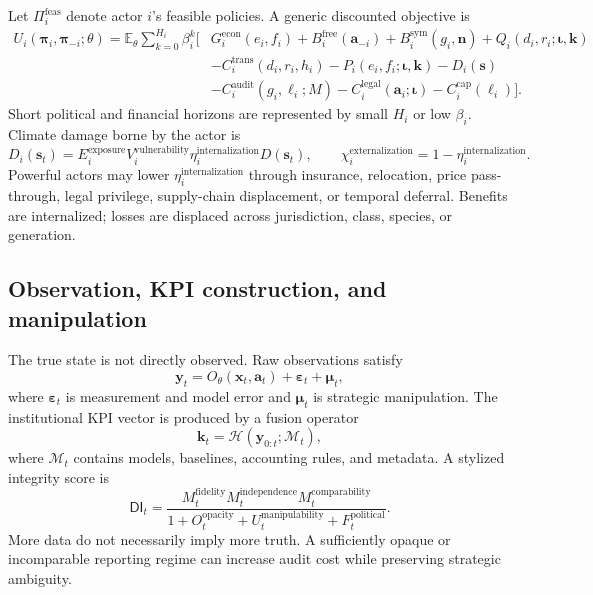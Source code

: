 \documentclass[11pt,a4paper]{article}
\numberwithin{equation}{section}
\theoremstyle{definition}
\theoremstyle{plain}
\theoremstyle{remark}
\newcommand{\E}{\mathbb{E}}
\newcommand{\policy}{\boldsymbol{\pi}}
\newcommand{\state}{\bm{x}}
\newcommand{\kpi}{\bm{k}}
\newcommand{\action}{\bm{a}}
\newcommand{\inst}{\bm{\iota}}
\newcommand{\narr}{\bm{n}}
\begin{document}
Let $\Pi_i^{\mathrm{feas}}$ denote actor $i$'s feasible policies. A generic discounted objective is
\begin{align}
U_i(\policy_i,\policy_{-i};\theta)
=\E_{\theta}\sum_{k=0}^{H_i}\beta_i^k\Big[&
G_i^{\mathrm{econ}}(e_i,f_i)
+B_i^{\mathrm{free}}(\action_{-i})
+B_i^{\mathrm{sym}}(g_i,\narr)
+Q_i(d_i,r_i;\inst,\kpi) \nonumber\\
&-C_i^{\mathrm{trans}}(d_i,r_i,h_i)
-P_i(e_i,f_i;\inst,\kpi)
-D_i(\bm{s}) \nonumber\\
&-C_i^{\mathrm{audit}}(g_i,\ell_i;M)
-C_i^{\mathrm{legal}}(\action_i;\inst)
-C_i^{\mathrm{cap}}(\ell_i)
\Big].
\label{eq:utility}
\end{align}
Short political and financial horizons are represented by small $H_i$ or low $\beta_i$. Climate damage borne by the actor is
\begin{equation}
D_i(\bm{s}_t)=E_i^{\mathrm{exposure}}V_i^{\mathrm{vulnerability}}
\eta_i^{\mathrm{internalization}}D(\bm{s}_t),
\qquad
\chi_i^{\mathrm{externalization}}=1-\eta_i^{\mathrm{internalization}}.
\label{eq:externalization}
\end{equation}
Powerful actors may lower $\eta_i^{\mathrm{internalization}}$ through insurance, relocation, price pass-through, legal privilege, supply-chain displacement, or temporal deferral. Benefits are internalized; losses are displaced across jurisdiction, class, species, or generation.

\subsection{Observation, KPI construction, and manipulation}

The true state is not directly observed. Raw observations satisfy
\begin{equation}
  \bm{y}_t=O_{\theta}(\state_t,\action_t)+\bm{\varepsilon}_t+\bm{\mu}_t,
  \label{eq:observation}
\end{equation}
where $\bm{\varepsilon}_t$ is measurement and model error and $\bm{\mu}_t$ is strategic manipulation. The institutional KPI vector is produced by a fusion operator
\begin{equation}
  \kpi_t=\mathcal H(\bm{y}_{0:t};\mathcal M_t),
  \label{eq:kpi}
\end{equation}
where $\mathcal M_t$ contains models, baselines, accounting rules, and metadata. A stylized integrity score is
\begin{equation}
\mathsf{DI}_t=
\frac{M_t^{\mathrm{fidelity}}M_t^{\mathrm{independence}}M_t^{\mathrm{comparability}}}
{1+O_t^{\mathrm{opacity}}+U_t^{\mathrm{manipulability}}+F_t^{\mathrm{political}}}.
\label{eq:dataintegrity}
\end{equation}
More data do not necessarily imply more truth. A sufficiently opaque or incomparable reporting regime can increase audit cost while preserving strategic ambiguity.
\end{document}
